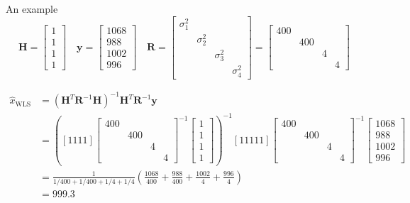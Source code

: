 \documentclass[a4paper]{article}
\begin{document}
An example
$$\mathbf{H}=\left[\begin{array}{l}{1} \\ {1} \\ {1} \\ {1}\end{array}\right] \quad \mathbf{y}=\left[\begin{array}{c}{1068} \\ {988} \\ {1002} \\ {996}\end{array}\right] \quad \mathbf{R}=\left[\begin{array}{cccc}{\sigma_{1}^{2}} & {} & {} & {}  \\ {} &  {\sigma_{2}^{2}} & {}  & {} \\  {} & {} &  {\sigma_{3}^{2}} & {} \\ {} & {} & {} & {\sigma_{4}^{2}}\end{array}\right]=
\left[\begin{array}{cccc}{400} & {}  & {}  & {} \\ 
                         {} & {400}  & {}   & {}  \\ 
                         {} & {} & {4} & {}  \\ 
                         {} & {} & {} & {4}
\end{array}\right]$$

$$\begin{aligned} \hat{x}_{\mathrm{WLS}} &=\left(\mathbf{H}^{T} \mathbf{R}^{-1} \mathbf{H}\right)^{-1} \mathbf{H}^{T} \mathbf{R}^{-1} \mathbf{y} \\ &=\left([1111]\left[\begin{array}{cccc}{400} & {}  & {}  & {} \\ 
                         {} & {400}  & {}   & {}  \\ 
                         {} & {} & {4} & {}  \\ 
                         {} & {} & {} & {4}
\end{array}\right]^{-1}
\left[\begin{array}{l}{1} \\ {1} \\ {1} \\ {1}\end{array}\right]
\right)^{-1}[11111]\left[\begin{array}{cccc}{400} & {}  & {}  & {} \\ 
                         {} & {400}  & {}   & {}  \\ 
                         {} & {} & {4} & {}  \\ 
                         {} & {} & {} & {4}
\end{array}\right]^{-1}\left[\begin{array}{c}{1068} \\ {988} \\ {1002} \\ {996}\end{array}\right] \\
 &= \frac{1}{1 / 400+1 / 400+1 / 4+1 / 4}\left(\frac{1068}{400}+\frac{988}{400}+\frac{1002}{4}+\frac{996}{4}\right) \\
 &= 999.3\end{aligned}$$
\end{document}
